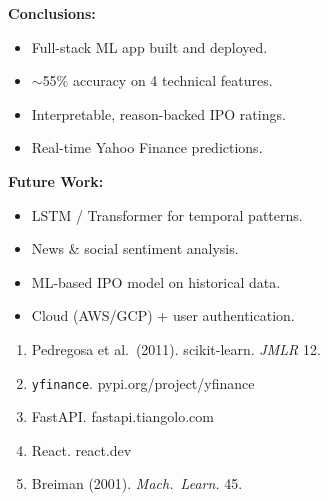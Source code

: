 \documentclass{article}
\newcommand{\bodyfont}{\fontsize{20}{24}\selectfont}
\begin{document}
\begin{minipage}[t]{0.315\linewidth}
\begin{tcolorbox}[sbox, title={[9] Conclusion \& Future Work}]
\bodyfont
\textbf{Conclusions:}
\begin{itemize}[noitemsep,topsep=3pt,leftmargin=1.4em,
    label={\color{bwacc}$\checkmark$}]
  \item Full-stack ML app built and deployed.
  \item $\sim$55\% accuracy on 4 technical features.
  \item Interpretable, reason-backed IPO ratings.
  \item Real-time Yahoo Finance predictions.
\end{itemize}
\vspace{4pt}
\textbf{Future Work:}
\begin{itemize}[noitemsep,topsep=3pt,leftmargin=1.4em,
    label={\color{corange}$\to$}]
  \item LSTM / Transformer for temporal patterns.
  \item News \& social sentiment analysis.
  \item ML-based IPO model on historical data.
  \item Cloud (AWS/GCP) + user authentication.
\end{itemize}
\end{tcolorbox}

\vspace{8pt}

\begin{tcolorbox}[sbox, title={[10] References}]
\bodyfont
\begin{enumerate}[noitemsep,topsep=3pt,leftmargin=1.6em]
  \item Pedregosa et al.\ (2011). scikit-learn. \textit{JMLR} 12.
  \item \texttt{yfinance}. pypi.org/project/yfinance
  \item FastAPI. fastapi.tiangolo.com
  \item React. react.dev
  \item Breiman (2001). \textit{Mach.\ Learn.} 45.
\end{enumerate}
\end{tcolorbox}

\end{minipage}

\vspace{6pt}
\end{document}
